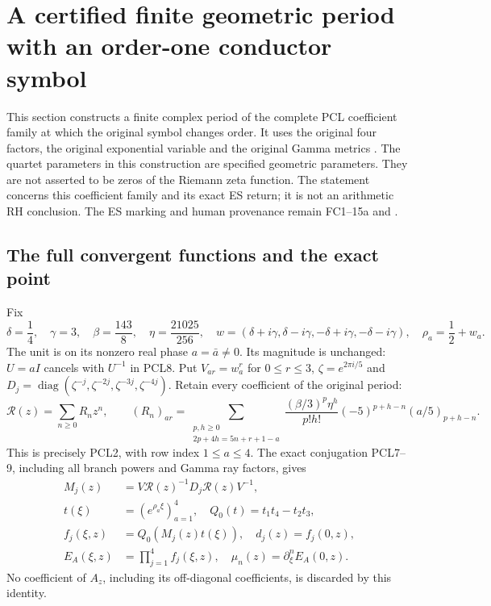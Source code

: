 \documentclass[11pt]{article}
\begin{document}
\section{A certified finite geometric period with an order-one conductor symbol}
\label{sec:finite-period-zero}

This section constructs a finite complex period of the complete PCL
coefficient family \cite{PCLOriginal} at which the original symbol changes order.
It uses the original four factors, the original exponential variable and
the original Gamma metrics \cite{WCF}. The quartet parameters in this
construction are specified geometric parameters. They are not asserted
to be zeros of the Riemann zeta function. The statement concerns this
coefficient family and its exact ES return; it is not an arithmetic RH
conclusion. The ES marking and human provenance remain FC1--15a and
\cite{ES488}.

\subsection{The full convergent functions and the exact point}
Fix
\[
 \delta=\frac14,\quad\gamma=3,\quad
 \beta=\frac{143}{8},\quad\eta=\frac{21025}{256},\quad
 w=(\delta+i\gamma,\delta-i\gamma,-\delta+i\gamma,-\delta-i\gamma),
 \quad\rho_a=\frac12+w_a.
 \tag{FPZ1}
\]
The unit is on its nonzero real phase $a=\bar a\ne0$. Its magnitude is
unchanged: $U=aI$ cancels with $U^{-1}$ in PCL8. Put
$V_{ar}=w_a^r$ for $0\le r\le3$, $\zeta=e^{2\pi i/5}$ and
$D_j=\operatorname{diag}(\zeta^{-j},\zeta^{-2j},\zeta^{-3j},\zeta^{-4j})$.
Retain every coefficient of the original period:
\[
 \mathcal R(z)=\sum_{n\ge0}R_nz^n,\qquad
 (R_n)_{ar}=\sum_{\substack{p,h\ge0\\2p+4h=5n+r+1-a}}
 \frac{(\beta/3)^p\eta^h}{p!h!}(-5)^{p+h-n}(a/5)_{p+h-n}.
 \tag{FPZ2}
\]
This is precisely PCL2, with row index $1\le a\le4$. The exact
conjugation PCL7--9, including all branch powers and Gamma ray factors,
gives
\[
 \begin{split}
 M_j(z)&=V\mathcal R(z)^{-1}D_j\mathcal R(z)V^{-1},\\
 t(\xi)&=(e^{\rho_a\xi})_{a=1}^4,\quad Q_0(t)=t_1t_4-t_2t_3,\\
 f_j(\xi,z)&=Q_0(M_j(z)t(\xi)),\quad d_j(z)=f_j(0,z),\\
 E_A(\xi,z)&=\prod_{j=1}^4f_j(\xi,z),\quad
 \mu_n(z)=\partial_\xi^n E_A(0,z).
 \end{split}\tag{FPZ3}
\]
No coefficient of $A_z$, including its off-diagonal coefficients, is
discarded by this identity.
\end{document}
